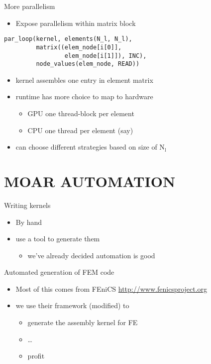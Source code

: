 \documentclass[bigger]{beamer}
\begin{document}
\begin{frame}[fragile,label={sec:orgheadline19}]{More parallelism}
 \begin{itemize}
\item Expose parallelism within matrix block
\end{itemize}

\begin{verbatim}
par_loop(kernel, elements(N_l, N_l),
         matrix((elem_node[i[0]],
                 elem_node[i[1]]), INC),
         node_values(elem_node, READ))
\end{verbatim}

\begin{itemize}
\item kernel assembles one entry in element matrix
\item runtime has more choice to map to hardware
\begin{itemize}
\item GPU one thread-block per element
\item CPU one thread per element (say)
\end{itemize}
\item can choose different strategies based on size of N\(_{\text{l}}\)
\end{itemize}
\end{frame}

\section{MOAR AUTOMATION}
\label{sec:orgheadline27}

\begin{frame}[label={sec:orgheadline21}]{Writing kernels}
\begin{itemize}
\item By hand
\item use a tool to generate them
\begin{itemize}
\item we've already decided automation is good
\end{itemize}
\end{itemize}
\end{frame}

\begin{frame}[label={sec:orgheadline22}]{Automated generation of FEM code}
\begin{itemize}
\item Most of this comes from FEniCS
\url{http://www.fenicsproject.org}
\item we use their framework (modified) to
\begin{itemize}
\item generate the assembly kernel for FE
\item \ldots{}
\item profit
\end{itemize}
\end{itemize}
\end{frame}
\end{document}
